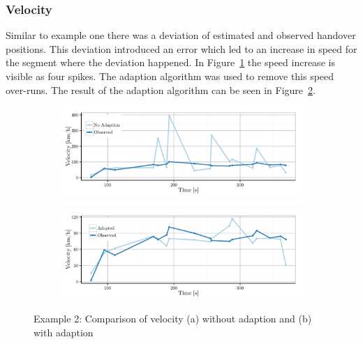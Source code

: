 \documentclass[master,english]{hgbthesis}
\begin{document}
\subsubsection{Velocity}
Similar to example one there was a deviation of estimated and observed handover positions. This deviation introduced an error which led to an increase in speed for the segment where the deviation happened. In Figure~\ref{fig:1058_velocityNoAdapt} the speed increase is visible as four spikes. The adaption algorithm was used to remove this speed over-runs. The result of the adaption algorithm can be seen in Figure~\ref{fig:1058_velocityAdapt}.
\begin{figure}
	\centering
	\begin{subfigure}[b]{\textwidth}
		\includegraphics[width=\textwidth]{./images/1058_velocityNoAdapt}
		\caption{}
		\label{fig:1058_velocityNoAdapt}
	\end{subfigure}%
	\begin{subfigure}[b]{\textwidth}
		\includegraphics[width=\textwidth]{./images/1058_velocityAdapt}
		\caption{}
		\label{fig:1058_velocityAdapt}
	\end{subfigure}
	\caption{Example 2: Comparison of velocity (a) without adaption  and (b) with adaption}\label{fig:1058velocity}
\end{figure}
\end{document}
